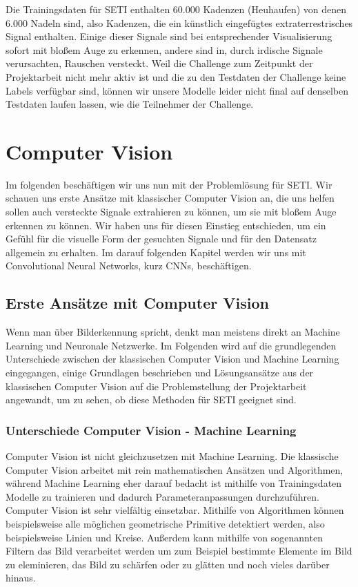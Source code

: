 \documentclass[12pt, a4paper]{article}
\begin{document}
Die Trainingsdaten für SETI enthalten 60.000 Kadenzen (Heuhaufen) von denen 6.000 Nadeln sind, also Kadenzen, die ein künstlich eingefügtes extraterrestrisches Signal enthalten. Einige dieser Signale sind bei entsprechender Visualisierung sofort mit bloßem Auge zu erkennen, andere sind in, durch irdische Signale verursachten, Rauschen versteckt. Weil die Challenge zum Zeitpunkt der Projektarbeit nicht mehr aktiv ist und die zu den Testdaten der Challenge keine Labels verfügbar sind, können wir unsere Modelle leider nicht final auf denselben Testdaten laufen lassen, wie die Teilnehmer der Challenge.

\section{Computer Vision}
Im folgenden beschäftigen wir uns nun mit der Problemlösung für SETI. Wir schauen uns erste Ansätze mit klassischer Computer Vision an, die uns helfen sollen auch versteckte Signale extrahieren zu können, um sie mit bloßem Auge erkennen zu können. Wir haben uns für diesen Einstieg entschieden, um ein Gefühl für die visuelle Form der gesuchten Signale und für den Datensatz allgemein zu erhalten. Im darauf folgenden Kapitel werden wir uns mit Convolutional Neural Networks, kurz CNNs, beschäftigen.

\subsection{Erste Ansätze mit Computer Vision}
Wenn man über Bilderkennung spricht, denkt man meistens direkt an Machine Learning und Neuronale Netzwerke. Im Folgenden wird auf die grundlegenden Unterschiede zwischen der klassischen Computer Vision und Machine Learning eingegangen, einige Grundlagen beschrieben und Lösungsansätze aus der klassischen Computer Vision auf die Problemstellung der Projektarbeit angewandt, um zu sehen, ob diese Methoden für SETI geeignet sind.

\subsubsection{Unterschiede Computer Vision - Machine Learning}
Computer Vision ist nicht gleichzusetzen mit Machine Learning. Die klassische Computer Vision arbeitet mit rein mathematischen Ansätzen und Algorithmen, während Machine Learning eher darauf bedacht ist mithilfe von Trainingsdaten Modelle zu trainieren und dadurch Parameteranpassungen durchzuführen. Computer Vision ist sehr vielfältig einsetzbar. Mithilfe von Algorithmen können beispielsweise alle möglichen geometrische Primitive detektiert werden, also beispielsweise Linien und Kreise. Außerdem kann mithilfe von sogenannten Filtern das Bild verarbeitet werden um zum Beispiel bestimmte Elemente im Bild zu eleminieren, das Bild zu schärfen oder zu glätten und noch vieles darüber hinaus.
\end{document}
